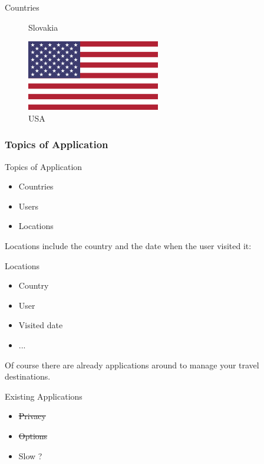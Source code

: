 \begin{frame}{Countries}
\begin{figure}[!ht]
\begin{minipage}{.24\textwidth}
\caption{Slovakia}
\end{minipage}
\begin{minipage}{.24\textwidth}
\centering
\includegraphics[width=0.8\linewidth]{img/countries/usa.png}
\caption{USA}
\end{minipage}

\end{figure}

\end{frame}

\subsubsection{Topics of Application}

\begin{frame}{Topics of Application}
\begin{itemize}
\item Countries
\item Users
\item Locations
\end{itemize}
\end{frame}

Locations include the country and the date when the 
user visited it:

\begin{frame}{Locations}
\begin{itemize}
\item Country
\item User
\item Visited date
\item ...
\end{itemize}
\end{frame}

Of course there are already applications around to manage
your travel destinations.


\begin{frame}{Existing Applications}
\begin{itemize}
\item \sout{Privacy}
\item \sout{Options}
\item Slow ?
\end{itemize}
\end{frame}

